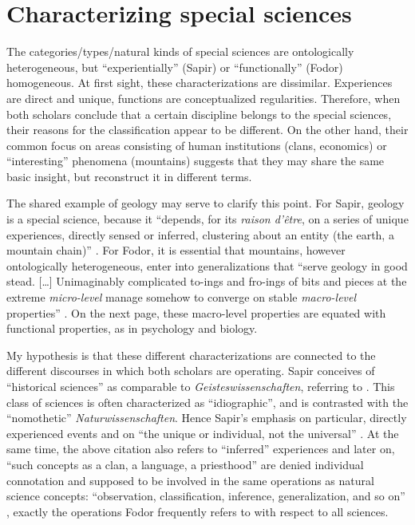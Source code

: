 \documentclass[output=paper]{langscibook}
\begin{document}
\section{Characterizing special sciences}
\label{sec:elffers:characterizing}

The categories/types/natural kinds of special sciences are ontologically heterogeneous, but
``experientially'' (Sapir) or ``functionally'' (Fodor) homogeneous. At first sight, these characterizations are dissimilar. Experiences are direct and unique, functions are conceptualized regularities. Therefore, when both scholars conclude that a certain discipline belongs to the special sciences, their reasons for the classification appear to be different. On the other hand, their common focus on areas consisting of human institutions (clans, economics) or ``interesting'' phenomena (mountains) suggests that they may share the same basic insight, but reconstruct it in different terms.

The shared example of geology may serve to clarify this point. For Sapir, geology is a special science, because it ``depends, for its \emph{raison d’être}, on a series of unique experiences, directly sensed or inferred, clustering about an entity (the earth, a mountain chain)'' \citep[445]{Sapir1917}. For Fodor, it is essential that mountains, however ontologically heterogeneous, enter into generalizations that ``serve geology in good stead. […] Unimaginably complicated to-ings and fro-ings of bits and pieces at the extreme \emph{micro-level} manage somehow to converge on stable \emph{macro-level} properties'' \citep[160]{Fodor1997}. On the next page, these macro-level properties are equated with functional properties, as in psychology and biology.

My hypothesis is that these different characterizations are connected to the different discourses in which both scholars are operating. Sapir conceives of ``historical sciences'' as comparable to \emph{Geisteswissenschaften}, referring to \citet{Rickert1913}. This class of sciences is often characterized as ``idiographic'', and is contrasted with the ``nomothetic'' \emph{Naturwissenschaften}. Hence Sapir's emphasis on particular, directly experienced events and on ``the unique or individual, not the universal'' \citep[446]{Sapir1917}. At the same time, the above citation also refers to ``inferred'' experiences and later on, ``such concepts as a clan, a language, a priesthood'' are denied individual connotation and supposed to be involved in the same operations as natural science concepts: ``observation, classification, inference, generalization, and so on'' \citep[446]{Sapir1917}, exactly the operations Fodor frequently refers to with respect to all sciences.
\end{document}
